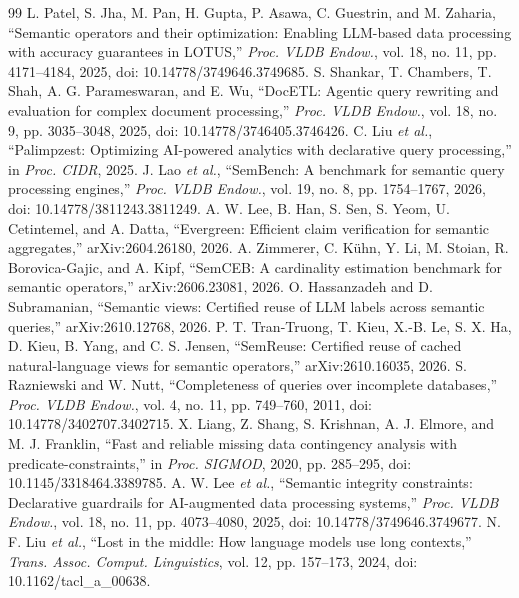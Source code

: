 \documentclass[conference]{IEEEtran}
\begin{document}
\begin{thebibliography}{99}
 L. Patel, S. Jha, M. Pan, H. Gupta, P. Asawa, C. Guestrin, and M. Zaharia, ``Semantic operators and their optimization: Enabling LLM-based data processing with accuracy guarantees in LOTUS,'' \emph{Proc. VLDB Endow.}, vol. 18, no. 11, pp. 4171--4184, 2025, doi: 10.14778/3749646.3749685.
 S. Shankar, T. Chambers, T. Shah, A. G. Parameswaran, and E. Wu, ``DocETL: Agentic query rewriting and evaluation for complex document processing,'' \emph{Proc. VLDB Endow.}, vol. 18, no. 9, pp. 3035--3048, 2025, doi: 10.14778/3746405.3746426.
 C. Liu \emph{et al.}, ``Palimpzest: Optimizing AI-powered analytics with declarative query processing,'' in \emph{Proc. CIDR}, 2025.
 J. Lao \emph{et al.}, ``SemBench: A benchmark for semantic query processing engines,'' \emph{Proc. VLDB Endow.}, vol. 19, no. 8, pp. 1754--1767, 2026, doi: 10.14778/3811243.3811249.
 A. W. Lee, B. Han, S. Sen, S. Yeom, U. Cetintemel, and A. Datta, ``Evergreen: Efficient claim verification for semantic aggregates,'' arXiv:2604.26180, 2026.
 A. Zimmerer, C. K\"uhn, Y. Li, M. Stoian, R. Borovica-Gajic, and A. Kipf, ``SemCEB: A cardinality estimation benchmark for semantic operators,'' arXiv:2606.23081, 2026.
 O. Hassanzadeh and D. Subramanian, ``Semantic views: Certified reuse of LLM labels across semantic queries,'' arXiv:2610.12768, 2026.
 P. T. Tran-Truong, T. Kieu, X.-B. Le, S. X. Ha, D. Kieu, B. Yang, and C. S. Jensen, ``SemReuse: Certified reuse of cached natural-language views for semantic operators,'' arXiv:2610.16035, 2026.
 S. Razniewski and W. Nutt, ``Completeness of queries over incomplete databases,'' \emph{Proc. VLDB Endow.}, vol. 4, no. 11, pp. 749--760, 2011, doi: 10.14778/3402707.3402715.
 X. Liang, Z. Shang, S. Krishnan, A. J. Elmore, and M. J. Franklin, ``Fast and reliable missing data contingency analysis with predicate-constraints,'' in \emph{Proc. SIGMOD}, 2020, pp. 285--295, doi: 10.1145/3318464.3389785.
 A. W. Lee \emph{et al.}, ``Semantic integrity constraints: Declarative guardrails for AI-augmented data processing systems,'' \emph{Proc. VLDB Endow.}, vol. 18, no. 11, pp. 4073--4080, 2025, doi: 10.14778/3749646.3749677.
 N. F. Liu \emph{et al.}, ``Lost in the middle: How language models use long contexts,'' \emph{Trans. Assoc. Comput. Linguistics}, vol. 12, pp. 157--173, 2024, doi: 10.1162/tacl\_a\_00638.

\end{thebibliography}
\end{document}
